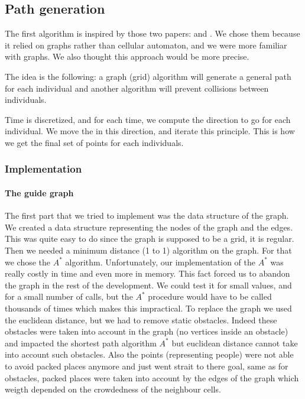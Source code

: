 \subsection{Path generation}

The first algorithm is inspired by those two papers: \cite{PLE} and
\cite{vandenBerg2011}. We chose them because it relied on graphs
rather than cellular automaton, and we were more familiar with
graphs. We also thought this approach would be more precise.


The idea is the following: a graph (grid) algorithm will generate a
general path for each individual and another algorithm will prevent
collisions between individuals.


Time is discretized, and for each time, we compute the direction to go
for each individual. We move the in this direction, and iterate this
principle. This is how we get the final set of points for each
individuals.


\subsubsection{Implementation}


\paragraph{The guide graph}

The first part that we tried to implement was the data structure of
the graph. We created a data structure representing the nodes of the
graph and the edges. This was quite easy to do since the graph is
supposed to be a grid, it is regular.  Then we needed a minimum
distance (1 to 1) algorithm on the graph. For that we chose the $A^*$
algorithm. Unfortunately, our implementation of the $A^*$ was really
costly in time and even more in memory. This fact forced us to abandon
the graph in the rest of the development. We could test it for small
values, and for a small number of calls, but the $A^*$ procedure would
have to be called thousands of times which makes this impractical.  To
replace the graph we used the euclidean distance, but we had to remove
 static obstacles. Indeed these obstacles were taken into
account in the graph (no vertices inside an obstacle) and impacted the
shortest path algorithm $A^*$ but euclidean distance cannot take into
account such obstacles.
Also the points (representing people) were not able to avoid packed
places anymore and just went strait to there goal, same as for obstacles,
packed places were taken into account by the edges of the graph which weigth
depended on the crowdedness of the neighbour cells.

